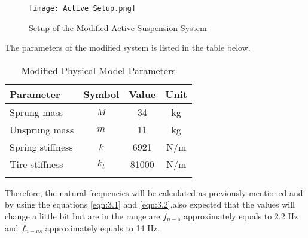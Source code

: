 \begin{figure}[H]
    \centering
    \texttt{[image: Active Setup.png]}
    \caption{Setup of the Modified Active Suspension System }
    \label{fig:Active schematic diagram}
    
\end{figure}
\newpage
The parameters of the modified system is listed in the table below.
\begin{table}[h]
    \centering
    \caption{Modified Physical Model Parameters}
    \begin{tabular}{lccc}

        \hline
        \textbf{Parameter} & \textbf{Symbol} & \textbf{Value}  & \textbf{Unit}  \\
        \hline

        Sprung mass & \( M \)& 34 & kg\\
        Unsprung mass & \( m \)& 11 & kg\\
        Spring stiffness & \( k \)& 6921 & N/m\\ 
        Tire stiffness & \( k_{t} \)& 81000 & N/m\\
        \hline
        \label{table:Parameter}
    \end{tabular}
\end{table}

Therefore, the natural frequencies will be calculated as previously mentioned and by using the equations \ref{eqn:3.1} and \ref{eqn:3.2},also expected that the values will change a little bit but are in the range are \( f_{n-s} \)  approximately equals to 2.2 Hz and \( f_{n-{us}} \)  approximately equals to 14 Hz.
\newpage
